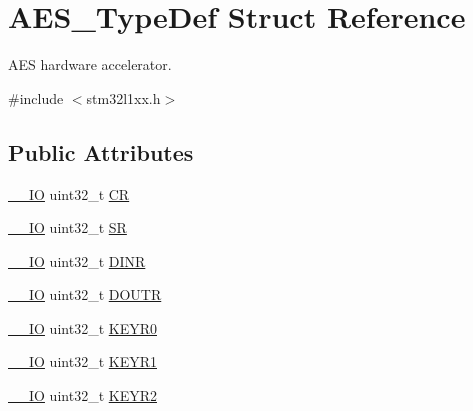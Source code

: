 \hypertarget{struct_a_e_s___type_def}{\section{A\-E\-S\-\_\-\-Type\-Def Struct Reference}
\label{struct_a_e_s___type_def}
}


A\-E\-S hardware accelerator.  




{\ttfamily \#include $<$stm32l1xx.\-h$>$}

\subsection*{Public Attributes}
\begin{DoxyCompactItemize}
\item 
\hyperlink{group___c_m_s_i_s__core__definitions_gaec43007d9998a0a0e01faede4133d6be}{\-\_\-\-\_\-\-I\-O} uint32\-\_\-t \hyperlink{struct_a_e_s___type_def_ad95f1a38ad551672f1d6c59299b99c1a}{C\-R}
\item 
\hyperlink{group___c_m_s_i_s__core__definitions_gaec43007d9998a0a0e01faede4133d6be}{\-\_\-\-\_\-\-I\-O} uint32\-\_\-t \hyperlink{struct_a_e_s___type_def_a567d574d42c57f0f5850eaada4eb1f31}{S\-R}
\item 
\hyperlink{group___c_m_s_i_s__core__definitions_gaec43007d9998a0a0e01faede4133d6be}{\-\_\-\-\_\-\-I\-O} uint32\-\_\-t \hyperlink{struct_a_e_s___type_def_a8df0ec8c0eae4b42c1ae5b7e01044c26}{D\-I\-N\-R}
\item 
\hyperlink{group___c_m_s_i_s__core__definitions_gaec43007d9998a0a0e01faede4133d6be}{\-\_\-\-\_\-\-I\-O} uint32\-\_\-t \hyperlink{struct_a_e_s___type_def_a93e69a0e82607ec9480d0e395b236ead}{D\-O\-U\-T\-R}
\item 
\hyperlink{group___c_m_s_i_s__core__definitions_gaec43007d9998a0a0e01faede4133d6be}{\-\_\-\-\_\-\-I\-O} uint32\-\_\-t \hyperlink{struct_a_e_s___type_def_a4fcb96eb7820d80f3f9027d3d19e0e48}{K\-E\-Y\-R0}
\item 
\hyperlink{group___c_m_s_i_s__core__definitions_gaec43007d9998a0a0e01faede4133d6be}{\-\_\-\-\_\-\-I\-O} uint32\-\_\-t \hyperlink{struct_a_e_s___type_def_a2755d099b5556ca661cad9c32eced4a4}{K\-E\-Y\-R1}
\item 
\hyperlink{group___c_m_s_i_s__core__definitions_gaec43007d9998a0a0e01faede4133d6be}{\-\_\-\-\_\-\-I\-O} uint32\-\_\-t \hyperlink{struct_a_e_s___type_def_a415157c12229e50b4ae5e2dedfa37069}{K\-E\-Y\-R2}
\item 

\end{DoxyCompactItemize}
